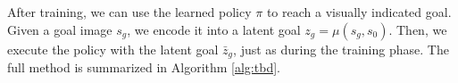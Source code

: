 After training, we can use the learned policy $\pi$ to reach a visually indicated goal. 
Given a goal image $s_g$, we encode it into a latent goal $z_g = \mu(s_g, s_0)$. 
Then, we execute the policy with the latent goal $\bar{z}_g$, just as during the training phase.
The full method is summarized in Algorithm \ref{alg:tbd}.

